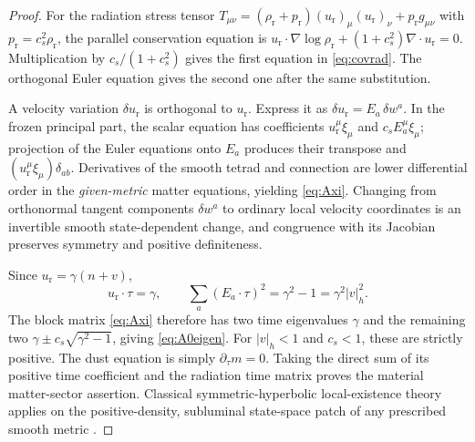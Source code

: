 \documentclass[11pt,a4paper]{article}
\begin{document}
\begin{proof}
For the radiation stress tensor
$T_{\mu\nu}=(\rho_{\mathrm r}+p_{\mathrm r})
(u_{\mathrm r})_\mu(u_{\mathrm r})_\nu
+p_{\mathrm r}g_{\mu\nu}$ with
$p_{\mathrm r}=c_s^2\rho_{\mathrm r}$,
the parallel conservation equation is
$u_{\mathrm r}\cdot\nabla\log\rho_{\mathrm r}
+(1+c_s^2)\nabla\cdot u_{\mathrm r}=0$.
Multiplication by $c_s/(1+c_s^2)$ gives
the first equation in \eqref{eq:covrad}.
The orthogonal Euler equation gives the
second one after the same substitution.

A velocity variation $\delta u_{\mathrm r}$
is orthogonal to $u_{\mathrm r}$.
Express it as $\delta u_{\mathrm r}
=E_a\,\delta w^a$.
In the frozen principal part,
the scalar equation has coefficients
$u_{\mathrm r}^\mu\xi_\mu$ and
$c_sE_a^\mu\xi_\mu$;
projection of the Euler equations onto
$E_a$ produces their transpose and
$(u_{\mathrm r}^\mu\xi_\mu)\delta_{ab}$.
Derivatives of the smooth tetrad
and connection are lower differential
order in the \emph{given-metric} matter
equations, yielding \eqref{eq:Axi}.
Changing from orthonormal tangent
components $\delta w^a$ to ordinary
local velocity coordinates is an
invertible smooth state-dependent
change, and congruence with its
Jacobian preserves symmetry and
positive definiteness.

Since $u_{\mathrm r}=\gamma(n+v)$,
\[
u_{\mathrm r}\cdot\tau=\gamma,\qquad
\sum_a(E_a\cdot\tau)^2
=\gamma^2-1=\gamma^2|v|_h^2.
\]
The block matrix \eqref{eq:Axi}
therefore has two time eigenvalues
$\gamma$ and the remaining two
$\gamma\pm c_s\sqrt{\gamma^2-1}$,
giving \eqref{eq:A0eigen}. For
$|v|_h<1$ and $c_s<1$, these are
strictly positive. The dust equation
is simply $\partial_\tau m=0$.
Taking the direct sum of its positive
time coefficient and the radiation
time matrix proves the material
matter-sector assertion.
Classical symmetric-hyperbolic
local-existence theory applies on
the positive-density, subluminal
state-space patch of any prescribed
smooth metric \cite{walton,friedrich}.
\end{proof}
\end{document}
